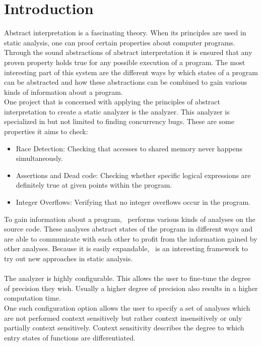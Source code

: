 
\chapter{Introduction}\label{chapter:introduction}
  Abstract interpretation is a fascinating theory. When its principles are used in static analysis, one can proof certain properties about computer programs. Through the sound abstractions of abstract interpretation it is ensured that any proven property holds true for any possible execution of a program. The most interesting part of this system are the different ways by which states of a program can be abstracted and how these abstractions can be combined to gain various kinds of information about a program.\\
  One project that is concerned with applying the principles of abstract interpretation to create a static analyzer is the \gob analyzer\parencite{goblintHome}. This analyzer is specialized in but not limited to finding concurrency bugs. These are some properties it aims to check:
  \begin{itemize}
    \item Race Detection: Checking that accesses to shared memory never happens simultaneously.
    \item Assertions and Dead code: Checking whether specific logical expressions are definitely true at given points within the program. 
    \item Integer Overflows: Verifying that no integer overflows occur in the program.
  \end{itemize}
  To gain information about a program, \gob\ performs various kinds of analyses on the source code. These analyses abstract states of the program in different ways and are able to communicate with each other to profit from the information gained by other analyses. Because it is easily expandable, \gob\ is an interesting framework to try out new approaches in static analysis.\\
  \\
  The analyzer is highly configurable. This allows the user to fine-tune the degree of precision they wish. Usually a higher degree of precision also results in a higher computation time.\\
  One such configuration option allows the user to specify a set of analyses which are not performed context sensitively but rather context insensitively or only partially context sensitively. Context sensitivity describes the degree to which entry states of functions are differentiated.\\
